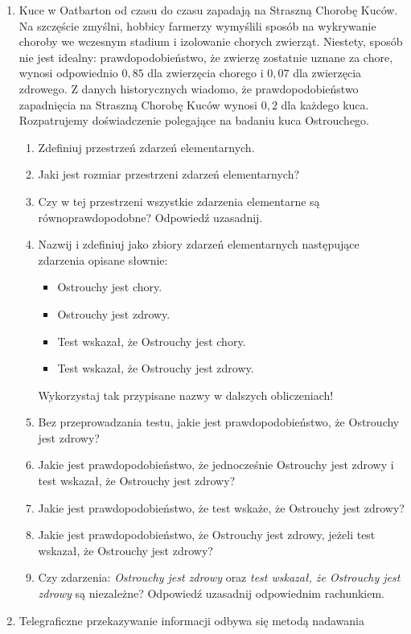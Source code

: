 \documentclass[twoside]{mwart}
\begin{document}
\begin{enumerate}
\clearpage
\item Kuce w Oatbarton od czasu do czasu zapadają na Straszną Chorobę Kuców.
Na szczęście zmyślni, hobbicy farmerzy wymyślili sposób na wykrywanie choroby we wczesnym stadium i izolowanie chorych zwierząt.
Niestety, sposób nie jest idealny: prawdopodobieństwo, że zwierzę zostatnie uznane za chore, wynosi odpowiednio $0,85$ dla zwierzęcia chorego i $0,07$ dla zwierzęcia zdrowego.
Z danych historycznych wiadomo, że prawdopodobieństwo zapadnięcia na Straszną Chorobę Kuców wynosi $0,2$ dla każdego kuca.
Rozpatrujemy doświadczenie polegające na badaniu kuca Ostrouchego.

\begin{enumerate}
\item Zdefiniuj przestrzeń zdarzeń elementarnych. 
\item Jaki jest rozmiar przestrzeni zdarzeń elementarnych? 
\item Czy w tej przestrzeni wszystkie zdarzenia elementarne są równoprawdopodobne? Odpowiedź uzasadnij. 
\item Nazwij i zdefiniuj jako zbiory zdarzeń elementarnych następujące zdarzenia opisane słownie: 
\begin{itemize}
\item Ostrouchy jest chory.
\item Ostrouchy jest zdrowy.
\item Test wskazał, że Ostrouchy jest chory.
\item Test wskazał, że Ostrouchy jest zdrowy.
\end{itemize}
Wykorzystaj tak przypisane nazwy w dalszych obliczeniach!
\item Bez przeprowadzania testu, jakie jest prawdopodobieństwo, że Ostrouchy jest zdrowy? 
\item Jakie jest prawdopodobieństwo, że jednocześnie Ostrouchy jest zdrowy i test wskazał, że Ostrouchy jest zdrowy? 
\item Jakie jest prawdopodobieństwo, że test wskaże, że Ostrouchy jest zdrowy? 
\item Jakie jest prawdopodobieństwo, że Ostrouchy jest zdrowy, jeżeli test wskazał, że Ostrouchy jest zdrowy? 
\item Czy zdarzenia: \emph{Ostrouchy jest zdrowy} oraz \emph{test wskazał, że Ostrouchy jest zdrowy} są niezależne? Odpowiedź uzasadnij odpowiednim rachunkiem. 
\end{enumerate}
\item Telegraficzne przekazywanie informacji odbywa się metodą nadawania

\end{enumerate}
\end{document}
